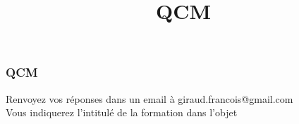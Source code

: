 \documentclass{formation}
\title{QCM}
\begin{document}
\begin{frame}
  \frametitle{QCM}
  Renvoyez vos réponses dans un email à giraud.francois@gmail.com \\
  Vous indiquerez l'intitulé de la formation dans l'objet
\end{frame}
\end{document}

